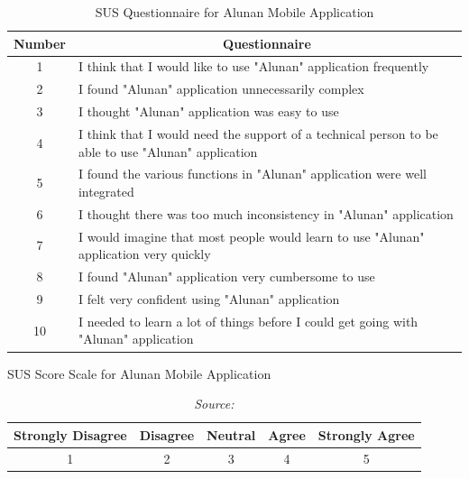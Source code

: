 \begin{enumerate}[A.]
    \begin{table}[htb]
    \caption{\centering SUS Questionnaire for Alunan Mobile Application}
    \label{tab:mytable}
    \centering
    \begin{tabular}{|p{3cm}|p{12cm}|}
    \hline
    \multicolumn{1}{|c|}{\textbf{Number}} & 
    \multicolumn{1}{c|}{\textbf{Questionnaire}} \\
    \hline 
    \multicolumn{1}{|c|}{1} & I think that I would like to use "Alunan" application frequently \\ \hline
    \multicolumn{1}{|c|}{2} & I found "Alunan" application unnecessarily complex \\ \hline
    \multicolumn{1}{|c|}{3} & I thought "Alunan" application was easy to use \\ \hline
    \multicolumn{1}{|c|}{4} & I think that I would need the support of a technical person to be able to use "Alunan" application \\ \hline
    \multicolumn{1}{|c|}{5} & I found the various functions in "Alunan" application were well integrated \\ \hline
    \multicolumn{1}{|c|}{6} & I thought there was too much inconsistency in "Alunan" application \\ \hline
    \multicolumn{1}{|c|}{7} & I would imagine that most people would learn to use "Alunan" application very quickly \\ \hline
    \multicolumn{1}{|c|}{8} & I found "Alunan" application very cumbersome to use \\ \hline
    \multicolumn{1}{|c|}{9} & I felt very confident using "Alunan" application \\ \hline
    \multicolumn{1}{|c|}{10} & I needed to learn a lot of things before I could get going with "Alunan" application \\ \hline
    \end{tabular}
    \end{table}
    
    \begin{table}[htb]
    \caption{\centering SUS Score Scale for Alunan Mobile Application}
    \caption*{\centering \textit{Source: \textcite{brooke95}}} 
    \label{tab:mytable}
    \centering
    \begin{tabular}{|p{5cm}|p{10cm}|p{10cm}|p{10cm}|p{5cm}|}
    \hline
    \multicolumn{1}{|c|}{\textbf{Strongly Disagree}} & 
    \multicolumn{1}{c|}{\textbf{Disagree}} & 
    \multicolumn{1}{c|}{\textbf{Neutral}} & 
    \multicolumn{1}{c|}{\textbf{Agree}} & 
    \multicolumn{1}{c|}{\textbf{Strongly Agree}} \\
    \hline 
    \multicolumn{1}{|c|}{1} & \multicolumn{1}{c|}{2} & \multicolumn{1}{c|}{3} & \multicolumn{1}{c|}{4} & \multicolumn{1}{c|}{5}\\ \hline
    \end{tabular}
    \end{table}


\end{enumerate}
